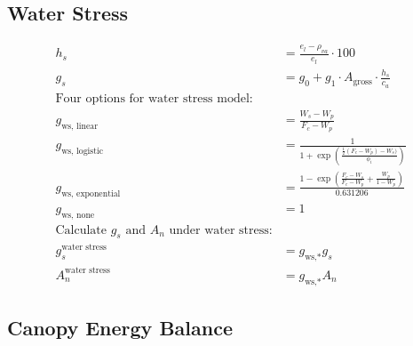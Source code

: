 \documentclass[10pt]{article}
\begin{document}
\subsection*{Water Stress}
\begin{align}
h_{s} &= \frac{e_{l} - \rho_{va}}{e_{l}} \cdot 100 \label{eqn:hs} \\
g_{s} &= g_{0} + g_{1} \cdot A_{\text{gross}} \cdot \frac{h_{s}}{c_{a}} \label{eqn:gs} \\
\text{Four options for water stress model:} \label{eqn:gws}\\
g_\text{ws, linear}&= \frac{W_s-W_p}{F_c-W_p}\\
g_\text{ws, logistic}&= \frac{1}{1+\exp\left(\frac{\frac{1}{2}(F_c-W_p)-W_s)}{\phi_i}\right)}\\
g_\text{ws, exponential}&= \frac{1-\exp\left(\frac{F_c-W_s}{F_c-W_p}+\frac{W_p}{1-W_p}\right)}{0.631206}\\
g_\text{ws, none}&= 1\\
\text{Calculate $g_s$ and $A_n$ under water stress:}\\
g_{s}^{\text{water stress}}&=g_\text{ws,*}g_s\\
A_{n}^{\text{water stress}}&=g_\text{ws,*}A_n
\end{align}

\subsection*{Canopy Energy Balance}
\end{document}
